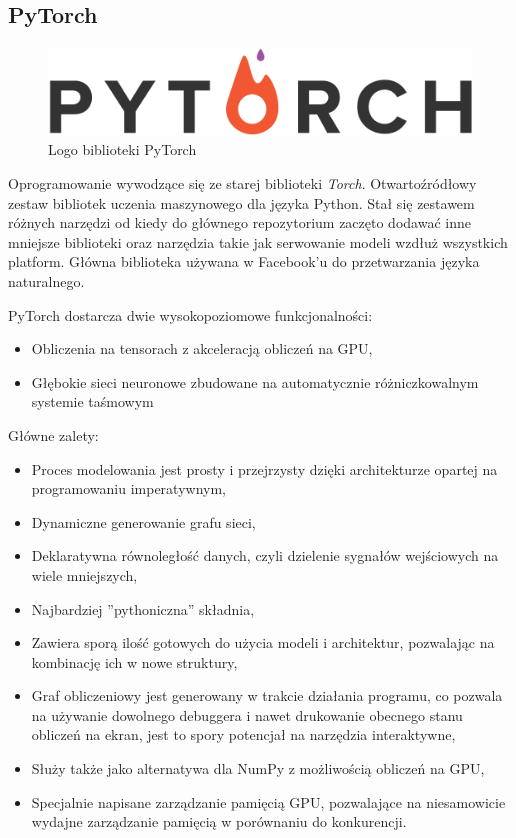 \documentclass[12pt,a4paper,twoside,titlepage,openright]{book}
\begin{document}
\subsection{PyTorch}
\begin{figure}[ht]
	\centering
			\includegraphics[resolution=100, scale=0.5]{PyTorch.png}
		\caption{Logo biblioteki PyTorch}
\end{figure}

Oprogramowanie wywodzące się ze starej biblioteki \textit{Torch}. Otwartoźródłowy zestaw bibliotek uczenia maszynowego dla języka Python. Stał się zestawem różnych narzędzi od kiedy do głównego repozytorium zaczęto dodawać inne mniejsze biblioteki oraz narzędzia takie jak serwowanie modeli wzdłuż wszystkich platform. Główna biblioteka używana w Facebook'u do przetwarzania języka naturalnego. 

PyTorch dostarcza dwie wysokopoziomowe funkcjonalności:
\begin{itemize}
\item Obliczenia na tensorach z akceleracją obliczeń na GPU,
\item Głębokie sieci neuronowe zbudowane na automatycznie różniczkowalnym systemie taśmowym
\end{itemize}

Główne zalety:
\begin{itemize}
\item Proces modelowania jest prosty i przejrzysty dzięki architekturze opartej na programowaniu imperatywnym,
\item Dynamiczne generowanie grafu sieci,
\item Deklaratywna równoległość danych, czyli dzielenie sygnałów wejściowych na wiele mniejszych,
\item Najbardziej ''pythoniczna'' składnia,
\item Zawiera sporą ilość gotowych do użycia modeli i architektur, pozwalając na kombinację ich w nowe struktury,
\item Graf obliczeniowy jest generowany w trakcie działania programu, co pozwala na używanie dowolnego debuggera i nawet drukowanie obecnego stanu obliczeń na ekran, jest to spory potencjał na narzędzia interaktywne,
\item Służy także jako alternatywa dla NumPy z możliwością obliczeń na GPU,
\item Specjalnie napisane zarządzanie pamięcią GPU, pozwalające na niesamowicie wydajne zarządzanie pamięcią w porównaniu do konkurencji.
\end{itemize}
\end{document}
